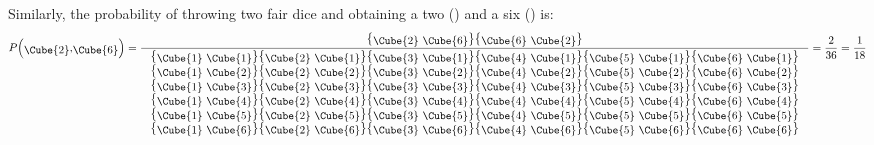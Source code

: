 Similarly, the probability of throwing two fair dice and obtaining a
two () and a six ()
is:
\begin{equation}
  P\!\left(\mbox{\raisebox{-2pt}{\Cube{2}},\raisebox{-2pt}{\Cube{6}}}\right) =
  \frac{
    \mbox{
      \big\{\raisebox{-2pt}{\Cube{2} \Cube{6}}\big\}\big\{\raisebox{-2pt}{\Cube{6} \Cube{2}}\big\}
    }
  }{
    \begin{array}{c}
      \mbox{
        \big\{\raisebox{-2pt}{\Cube{1} \Cube{1}}\big\}\big\{\raisebox{-2pt}{\Cube{2} \Cube{1}}\big\}\big\{\raisebox{-2pt}{\Cube{3} \Cube{1}}\big\}\big\{\raisebox{-2pt}{\Cube{4} \Cube{1}}\big\}\big\{\raisebox{-2pt}{\Cube{5} \Cube{1}}\big\}\big\{\raisebox{-2pt}{\Cube{6} \Cube{1}}\big\}
      }\\
      \mbox{
        \big\{\raisebox{-2pt}{\Cube{1} \Cube{2}}\big\}\big\{\raisebox{-2pt}{\Cube{2} \Cube{2}}\big\}\big\{\raisebox{-2pt}{\Cube{3} \Cube{2}}\big\}\big\{\raisebox{-2pt}{\Cube{4} \Cube{2}}\big\}\big\{\raisebox{-2pt}{\Cube{5} \Cube{2}}\big\}\big\{\raisebox{-2pt}{\Cube{6} \Cube{2}}\big\}
      }\\
      \mbox{
        \big\{\raisebox{-2pt}{\Cube{1} \Cube{3}}\big\}\big\{\raisebox{-2pt}{\Cube{2} \Cube{3}}\big\}\big\{\raisebox{-2pt}{\Cube{3} \Cube{3}}\big\}\big\{\raisebox{-2pt}{\Cube{4} \Cube{3}}\big\}\big\{\raisebox{-2pt}{\Cube{5} \Cube{3}}\big\}\big\{\raisebox{-2pt}{\Cube{6} \Cube{3}}\big\}
      }\\
      \mbox{
        \big\{\raisebox{-2pt}{\Cube{1} \Cube{4}}\big\}\big\{\raisebox{-2pt}{\Cube{2} \Cube{4}}\big\}\big\{\raisebox{-2pt}{\Cube{3} \Cube{4}}\big\}\big\{\raisebox{-2pt}{\Cube{4} \Cube{4}}\big\}\big\{\raisebox{-2pt}{\Cube{5} \Cube{4}}\big\}\big\{\raisebox{-2pt}{\Cube{6} \Cube{4}}\big\}
      }\\
      \mbox{
        \big\{\raisebox{-2pt}{\Cube{1} \Cube{5}}\big\}\big\{\raisebox{-2pt}{\Cube{2} \Cube{5}}\big\}\big\{\raisebox{-2pt}{\Cube{3} \Cube{5}}\big\}\big\{\raisebox{-2pt}{\Cube{4} \Cube{5}}\big\}\big\{\raisebox{-2pt}{\Cube{5} \Cube{5}}\big\}\big\{\raisebox{-2pt}{\Cube{6} \Cube{5}}\big\}
      }\\
      \mbox{
        \big\{\raisebox{-2pt}{\Cube{1} \Cube{6}}\big\}\big\{\raisebox{-2pt}{\Cube{2} \Cube{6}}\big\}\big\{\raisebox{-2pt}{\Cube{3} \Cube{6}}\big\}\big\{\raisebox{-2pt}{\Cube{4} \Cube{6}}\big\}\big\{\raisebox{-2pt}{\Cube{5} \Cube{6}}\big\}\big\{\raisebox{-2pt}{\Cube{6} \Cube{6}}\big\}
      }
    \end{array}
  } = \frac{2}{36} = \frac{1}{18}
  \label{eq:1116}
\end{equation}

